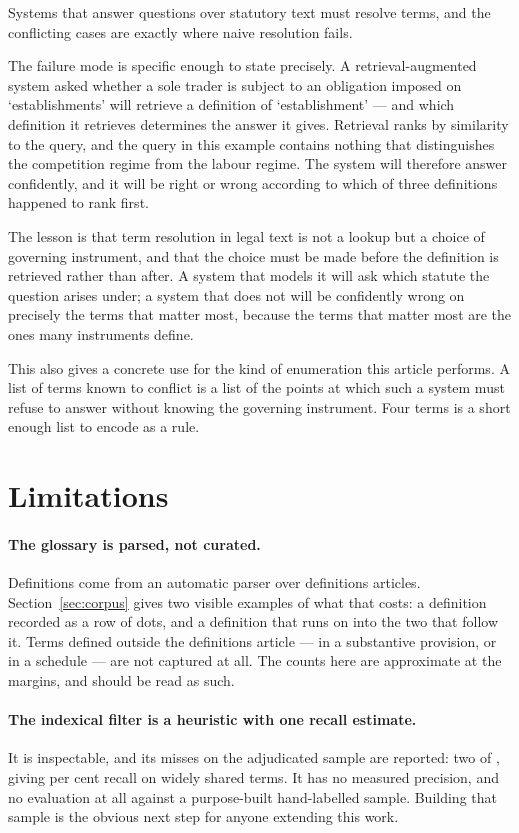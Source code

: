 \documentclass[11pt]{article}
\begin{document}
Systems that answer questions over statutory text must resolve terms, and the
conflicting cases are exactly where naive resolution fails.

The failure mode is specific enough to state precisely. A
retrieval-augmented system asked whether a sole trader is subject to an
obligation imposed on `establishments' will retrieve a definition of
`establishment' --- and which definition it retrieves determines the answer
it gives. Retrieval ranks by similarity to the query, and the query in this
example contains nothing that distinguishes the competition regime from the
labour regime. The system will therefore answer confidently, and it will be
right or wrong according to which of three definitions happened to rank
first.

The lesson is that term resolution in legal text is not a lookup but a choice
of governing instrument, and that the choice must be made before the
definition is retrieved rather than after. A system that models it will ask
which statute the question arises under; a system that does not will be
confidently wrong on precisely the terms that matter most, because the terms
that matter most are the ones many instruments define.

This also gives a concrete use for the kind of enumeration this article
performs. A list of terms known to conflict is a list of the points at which
such a system must refuse to answer without knowing the governing instrument.
Four terms is a short enough list to encode as a rule.

\section{Limitations}

\paragraph{The glossary is parsed, not curated.} Definitions come from an
automatic parser over definitions articles. Section~\ref{sec:corpus} gives two visible
examples of what that costs: a definition recorded as a row of dots, and a
definition that runs on into the two that follow it. Terms defined outside
the definitions article --- in a substantive provision, or in a schedule ---
are not captured at all. The counts here are approximate at the margins, and
should be read as such.

\paragraph{The indexical filter is a heuristic with one recall estimate.} It
is inspectable, and its misses on the adjudicated sample are reported: two of
\nReviewed{}, giving \nFilterRecall{} per cent recall on widely shared terms. It has no
measured precision, and no evaluation at all against a purpose-built
hand-labelled sample. Building that sample is the obvious next step for
anyone extending this work.
\end{document}
